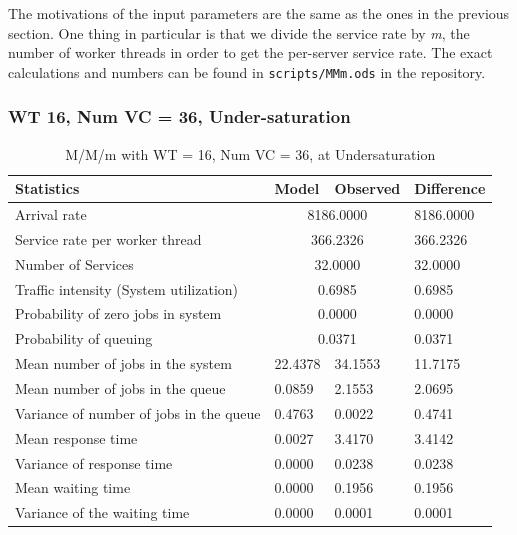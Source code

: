 \documentclass[11pt,a4paper]{article}
\begin{document}
 The motivations of the input parameters are the same as the ones in the previous section. One thing in particular is that we divide the service rate by \textit{m}, the number of worker threads in order to get the per-server service rate.
 The exact calculations and numbers can be found in \texttt{scripts/MMm.ods} in the repository.
 
 
\subsubsection{WT 16, Num VC = 36, Under-saturation}

\begin{table}[H]
	\centering
	\caption{M/M/m with WT = 16, Num VC = 36, at Undersaturation}
	\begin{tabular}{|l|l|l|l|}
		\hline
		Statistics                              & Model         & Observed       & Difference \\ \hline
		Arrival rate                            & \multicolumn{2}{c|}{8186.0000} & 8186.0000  \\ \hline
		Service rate per worker thread          & \multicolumn{2}{c|}{366.2326}  & 366.2326   \\ \hline
		Number of Services                      & \multicolumn{2}{c|}{32.0000}   & 32.0000    \\ \hline
		Traffic intensity (System utilization)  & \multicolumn{2}{c|}{0.6985}    & 0.6985     \\ \hline
		Probability of zero jobs in system      & \multicolumn{2}{c|}{0.0000}    & 0.0000     \\ \hline
		Probability of queuing                 & \multicolumn{2}{c|}{0.0371}    & 0.0371     \\ \hline
		Mean number of jobs in the system       & 22.4378       & 34.1553        & 11.7175    \\ \hline
		Mean number of jobs in the queue        & 0.0859        & 2.1553         & 2.0695     \\ \hline
		Variance of number of jobs in the queue & 0.4763        & 0.0022         & 0.4741     \\ \hline
		Mean response time                      & 0.0027        & 3.4170         & 3.4142     \\ \hline
		Variance of response time               & 0.0000        & 0.0238         & 0.0238     \\ \hline
		Mean waiting time                       & 0.0000        & 0.1956         & 0.1956     \\ \hline
		Variance of the waiting time            & 0.0000        & 0.0001         & 0.0001     \\ \hline
	\end{tabular}
\end{table}
\end{document}
